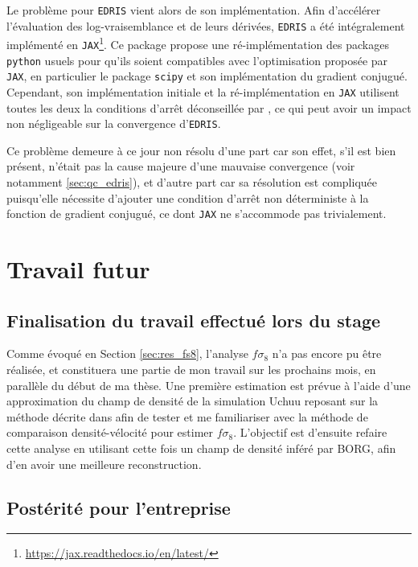 \documentclass{book}
\def\edris{\texttt{EDRIS}\xspace}
\begin{document}
Le problème pour \edris  vient alors de son implémentation. Afin d'accélérer l'évaluation des log-vraisemblance et de leurs dérivées, \edris a été intégralement implémenté en \texttt{JAX}\footnote{\href{https://jax.readthedocs.io/en/latest/}{https://jax.readthedocs.io/en/latest/}}. Ce package propose une ré-implémentation des packages \texttt{python} usuels pour qu'ils soient compatibles avec l'optimisation proposée par \texttt{JAX}, en particulier le package \texttt{scipy} et son implémentation du gradient conjugué. Cependant, son implémentation initiale et la ré-implémentation en \texttt{JAX} utilisent toutes les deux la conditions d'arrêt déconseillée par \cite{martens_deep_2010}, ce qui peut avoir un impact non négligeable sur la convergence d'\edris.

Ce problème demeure à ce jour non résolu d'une part car son effet, s'il est bien présent, n'était pas la cause majeure d'une mauvaise convergence (voir notamment \ref{sec:qc_edris}), et d'autre part car sa résolution est compliquée puisqu'elle nécessite d'ajouter une condition d'arrêt non déterministe à la fonction de gradient conjugué, ce dont \texttt{JAX} ne s’accommode pas trivialement.


\chapter{Travail futur}


\section{Finalisation du travail effectué lors du stage}

Comme évoqué en Section \ref{sec:res_fs8}, l'analyse $f\sigma_8$ n'a pas encore pu être réalisée, et constituera une partie de mon travail sur les prochains mois, en parallèle du début de ma thèse. Une première estimation est prévue à l'aide d'une approximation du champ de densité de la simulation Uchuu reposant sur la méthode décrite dans \cite{carrick_cosmological_2015} afin de tester et me familiariser avec la méthode de comparaison densité-vélocité pour estimer $f\sigma_8$. L'objectif est d'ensuite refaire cette analyse en utilisant cette fois un champ de densité inféré par BORG, afin d'en avoir une meilleure reconstruction.
 
\section{Postérité pour l'entreprise}
\end{document}
